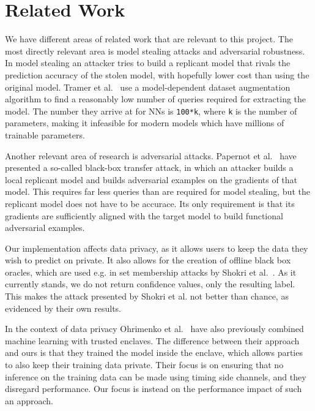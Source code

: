 \documentclass[11pt,twocolumn]{article}
\begin{document}
\section{Related Work}
\label{sec:related}

We have different areas of related work that are relevant to this project.
The most directly relevant area is model stealing attacks and adversarial robustness.
In model stealing an attacker tries to build a replicant model that rivals the prediction accuracy of the stolen model, with hopefully lower cost than using the original model.
Tramer et al.~\cite{tramer_stealing_2016} use a model-dependent dataset augmentation algorithm to find a reasonably low number of queries required for extracting the model.
The number they arrive at for NNs is \texttt{100*k}, where \texttt{k} is the number of parameters, making it infeasible for modern models which have millions of trainable parameters.

Another relevant area of research is adversarial attacks.
Papernot et al.~\cite{papernot_practical_2017} have presented a so-called black-box transfer attack, in which an attacker builds a local replicant model and builds adversarial examples on the gradients of that model.
This requires far less queries than are required for model stealing, but the replicant model does not have to be accurace.
Its only requirement is that its gradients are sufficiently aligned with the target model to build functional adversarial examples.

Our implementation affects data privacy, as it allows users to keep the data they wish to predict on private.
It also allows for the creation of offline black box oracles, which are used e.g. in set membership attacks by Shokri et al.~\cite{shokri_membership_2017}.
As it currently stands, we do not return confidence values, only the resulting label.
This makes the attack presented by Shokri et al. not better than chance, as evidenced by their own results.

In the context of data privacy Ohrimenko et al.~\cite{ohrimenko_oblivious_2016} have also previously combined machine learning with trusted enclaves.
The difference between their approach and ours is that they trained the model inside the enclave, which allows parties to also keep their training data private.
Their focus is on ensuring that no inference on the training data can be made using timing side channels, and they disregard performance.
Our focus is instead on the performance impact of such an approach.
\end{document}
